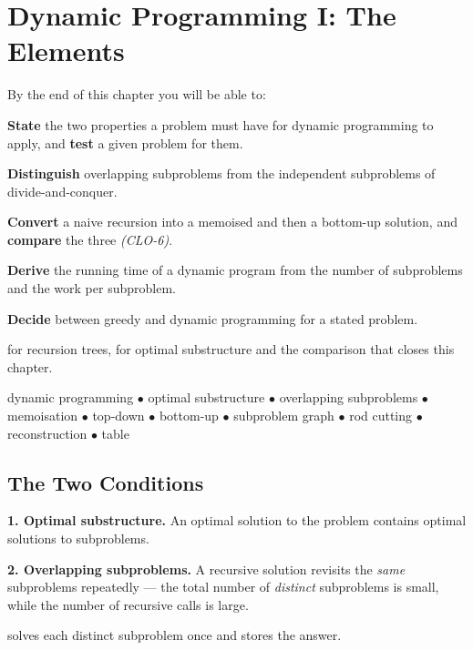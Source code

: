 \chapter{Dynamic Programming I: The Elements}\label{ch:dpone}

\begin{outcomes}
By the end of this chapter you will be able to:
\begin{tight}
  \item \textbf{State} the two properties a problem must have for dynamic
        programming to apply, and \textbf{test} a given problem for them.
  \item \textbf{Distinguish} overlapping subproblems from the independent
        subproblems of divide-and-conquer.
  \item \textbf{Convert} a naive recursion into a memoised and then a bottom-up
        solution, and \textbf{compare} the three \emph{(CLO-6)}.
  \item \textbf{Derive} the running time of a dynamic program from the number
        of subproblems and the work per subproblem.
  \item \textbf{Decide} between greedy and dynamic programming for a stated
        problem.
\end{tight}
\end{outcomes}

\begin{prereq}
 for recursion trees,  for optimal
substructure and the comparison that closes this chapter.
\end{prereq}

\begin{keyterms}
dynamic programming $\bullet$ optimal substructure $\bullet$ overlapping
subproblems $\bullet$ memoisation $\bullet$ top-down $\bullet$ bottom-up
$\bullet$ subproblem graph $\bullet$ rod cutting $\bullet$ reconstruction
$\bullet$ table
\end{keyterms}

\section{The Two Conditions}

\begin{definitionbox}
\textbf{1. Optimal substructure.} An optimal solution to the problem contains
optimal solutions to subproblems.

\smallskip
\textbf{2. Overlapping subproblems.} A recursive solution revisits the
\emph{same} subproblems repeatedly --- the total number of \emph{distinct}
subproblems is small, while the number of recursive calls is large.

\smallskip
{} solves each distinct subproblem once and stores the
answer.
\end{definitionbox}

